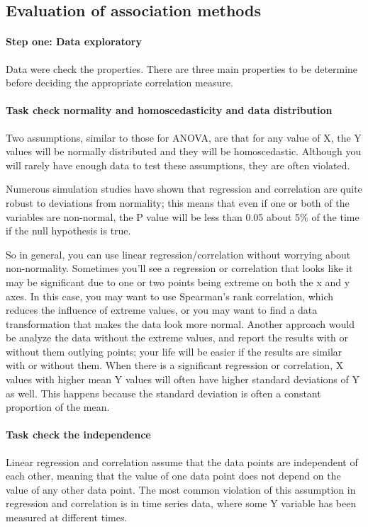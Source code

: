\documentclass[a4paper]{article}
\begin{document}
\subsection*{Evaluation of association methods}

\paragraph{Step one: Data exploratory}
Data were check the properties. There are three main properties to be determine before deciding the appropriate correlation measure. 

\paragraph{Task check normality and homoscedasticity and data distribution}
Two assumptions, similar to those for ANOVA, are that for any value of X, the Y values will be normally distributed and they will be homoscedastic. Although you will rarely have enough data to test these assumptions, they are often violated.

Numerous simulation studies have shown that regression and correlation are quite robust to deviations from normality; this means that even if one or both of the variables are non-normal, the P value will be less than 0.05 about 5\% of the time if the null hypothesis is true. 

So in general, you can use linear regression/correlation without worrying about non-normality.
Sometimes you'll see a regression or correlation that looks like it may be significant due to one or two points being extreme on both the x and y axes. In this case, you may want to use Spearman's rank correlation, which reduces the influence of extreme values, or you may want to find a data transformation that makes the data look more normal. Another approach would be analyze the data without the extreme values, and report the results with or without them outlying points; your life will be easier if the results are similar with or without them.
When there is a significant regression or correlation, X values with higher mean Y values will often have higher standard deviations of Y as well. This happens because the standard deviation is often a constant proportion of the mean. 

\paragraph{Task check the independence}
Linear regression and correlation assume that the data points are independent of each other, meaning that the value of one data point does not depend on the value of any other data point. The most common violation of this assumption in regression and correlation is in time series data, where some Y variable has been measured at different times.
\end{document}
